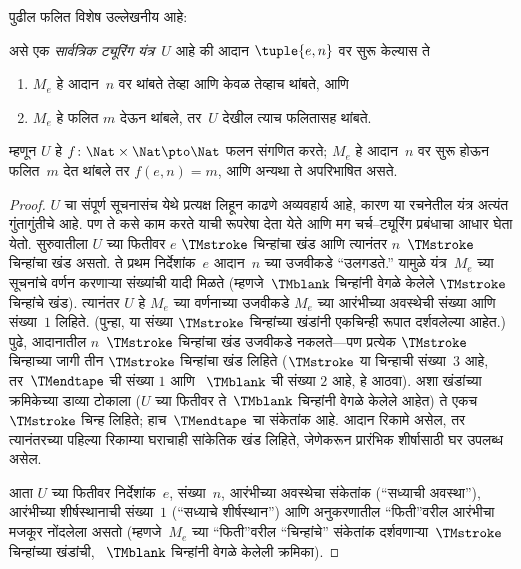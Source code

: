 \documentclass[../../../include/open-logic-section]{subfiles}
\begin{document}
पुढील फलित विशेष उल्लेखनीय आहे:

\begin{thm} असे एक \emph{सार्वत्रिक
  ट्यूरिंग यंत्र}~$U$ आहे की आदान $\tuple{e,n}$ वर
  सुरू केल्यास ते
  \begin{enumerate}
    \item $M_e$ हे आदान~$n$ वर थांबते तेव्हा आणि केवळ तेव्हाच थांबते, आणि
    \item $M_e$ हे फलित $m$ देऊन थांबले, तर~$U$ देखील
    त्याच फलितासह थांबते.
  \end{enumerate}
  म्हणून $U$ हे $f\colon \Nat \times \Nat \pto \Nat$
  फलन संगणित करते; $M_e$ हे आदान~$n$ वर सुरू
  होऊन फलित~$m$ देत थांबले तर $f(e,n) = m$,
  आणि अन्यथा ते अपरिभाषित असते.
\end{thm}

\begin{proof}
  $U$ चा संपूर्ण सूचनासंच येथे प्रत्यक्ष लिहून काढणे अव्यवहार्य आहे, कारण
  या रचनेतील यंत्र अत्यंत गुंतागुंतीचे आहे. पण ते कसे
  काम करते याची रूपरेषा देता येते आणि मग
  चर्च--ट्यूरिंग प्रबंधाचा आधार घेता येतो.
  सुरुवातीला $U$ च्या फितीवर $e$ $\TMstroke$
  चिन्हांचा खंड आणि त्यानंतर $n$~$\TMstroke$
  चिन्हांचा खंड असतो. ते प्रथम निर्देशांक~$e$
  आदान~$n$ च्या उजवीकडे “उलगडते.” यामुळे
  यंत्र~$M_e$ च्या सूचनांचे वर्णन करणाऱ्या
  संख्यांची यादी मिळते (म्हणजे~$\TMblank$
  चिन्हांनी वेगळे केलेले $\TMstroke$ चिन्हांचे
  खंड). त्यानंतर $U$ हे $M_e$ च्या वर्णनाच्या
  उजवीकडे $M_e$ च्या आरंभीच्या अवस्थेची
  संख्या आणि संख्या~$1$ लिहिते. (पुन्हा,
  या संख्या $\TMstroke$ चिन्हांच्या खंडांनी
  एकचिन्ही रूपात दर्शवलेल्या आहेत.) पुढे,
  आदानातील $n$~$\TMstroke$ चिन्हांचा खंड
  उजवीकडे नकलते---पण प्रत्येक $\TMstroke$
  चिन्हाच्या जागी तीन $\TMstroke$ चिन्हांचा
  खंड लिहिते ($\TMstroke$ या चिन्हाची संख्या~$3$
  आहे, तर~$\TMendtape$ ची संख्या $1$ आणि
  ~$\TMblank$ ची संख्या $2$ आहे, हे आठवा).
  अशा खंडांच्या क्रमिकेच्या डाव्या टोकाला
  ($U$ च्या फितीवर ते~$\TMblank$ चिन्हांनी
  वेगळे केलेले आहेत) ते एकच~$\TMstroke$
  चिन्ह लिहिते; हाच~$\TMendtape$ चा संकेतांक आहे.
  आदान रिकामे असेल, तर त्यानंतरच्या पहिल्या रिकाम्या घराचाही
  सांकेतिक खंड लिहिते, जेणेकरून प्रारंभिक शीर्षासाठी घर उपलब्ध असेल.

  आता $U$ च्या फितीवर निर्देशांक~$e$, संख्या~$n$,
  आरंभीच्या अवस्थेचा संकेतांक (“सध्याची अवस्था”),
  आरंभीच्या शीर्षस्थानाची संख्या~$1$
  (“सध्याचे शीर्षस्थान”) आणि अनुकरणातील
  “फिती”वरील आरंभीचा मजकूर नोंदलेला असतो
  (म्हणजे~$M_e$ च्या “फिती”वरील “चिन्हांचे”
  संकेतांक दर्शवणाऱ्या~$\TMstroke$ चिन्हांच्या
  खंडांची, ~$\TMblank$ चिन्हांनी वेगळे केलेली
  क्रमिका).


\end{proof}
\end{document}
